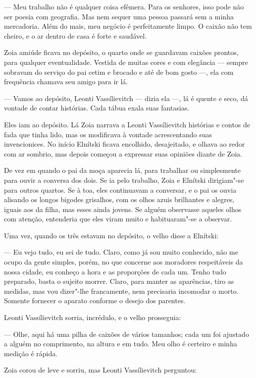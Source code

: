 --- Meu trabalho não é qualquer coisa efêmera. Para os senhores, isso
pode não ser poesia com geografia. Mas nem sequer uma pessoa passará sem
a minha mercadoria. Além do mais, meu negócio é perfeitamente limpo. O
caixão não tem cheiro, e o ar dentro de casa é forte e saudável.

Zoia amiúde ficava no depósito, o quarto onde se guardavam caixões
prontos, para qualquer eventualidade. Vestida de muitas cores e com
elegância --- sempre sobravam do serviço do pai cetim e brocado e até de
bom gosto ---, ela com frequência chamava seu amigo para ir lá.

--- Vamos ao depósito, Leonti Vassílievitch --- dizia ela ---, lá é
quente e seco, dá vontade de contar histórias. Cada tábua exala suas
fantasias.

Eles iam ao depósito. Lá Zoia narrava a Leonti Vassílievitch histórias e
contos de fada que tinha lido, mas os modificava à vontade acrescentando
suas invencionices. No início Elnítski ficava encolhido, desajeitado, e
olhava ao redor com ar sombrio, mas depois começou a expressar suas
opiniões diante de Zoia.

De vez em quando o pai da moça aparecia lá, para trabalhar ou
simplesmente para ouvir a conversa dos dois. Se ia pelo trabalho, Zoia e
Elnítski dirigiam"-se para outros quartos. Se à toa, eles continuavam a
conversar, e o pai os ouvia alisando os longos bigodes grisalhos, com os
olhos azuis brilhantes e alegres, iguais aos da filha, mas esses ainda
jovens. Se alguém observasse aqueles olhos com atenção, entenderia que
eles viram muito e habituaram"-se a observar.

Uma vez, quando os três estavam no depósito, o velho disse a Elnítski:

--- Eu vejo tudo, eu sei de tudo. Claro, como já sou muito conhecido,
não me ocupo da gente simples, porém, no que concerne aos moradores
respeitáveis da nossa cidade, eu conheço a hora e as proporções de cada
um. Tenho tudo preparado, basta o sujeito morrer. Claro, para manter as
aparências, tiro as medidas, mas vou dizer"-lhe francamente, nem
precisaria incomodar o morto. Somente fornecer o aparato conforme o
desejo dos parentes.

Leonti Vassílievitch sorria, incrédulo, e o velho prosseguia:

--- Olhe, aqui há uma pilha de caixões de vários tamanhos; cada um foi
ajustado a alguém no comprimento, na altura e em tudo. Meu olho é
certeiro e minha medição é rápida.

Zoia corou de leve e sorriu, mas Leonti Vassílievitch perguntou:

